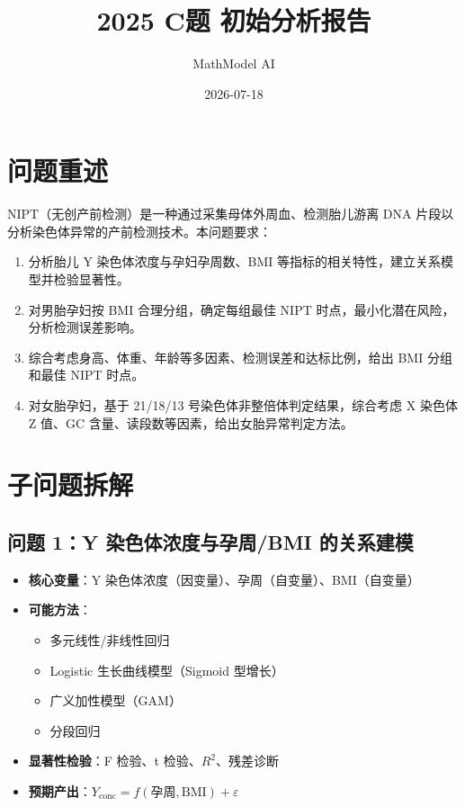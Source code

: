 \documentclass{internal-report}
\title{2025 C题 初始分析报告}
\author{MathModel AI}
\date{2026-07-18}
\begin{document}
\maketitle

\section{问题重述}

NIPT（无创产前检测）是一种通过采集母体外周血、检测胎儿游离 DNA 片段以分析染色体异常的产前检测技术。本问题要求：

\begin{enumerate}
  \item 分析胎儿 Y 染色体浓度与孕妇孕周数、BMI 等指标的相关特性，建立关系模型并检验显著性。
  \item 对男胎孕妇按 BMI 合理分组，确定每组最佳 NIPT 时点，最小化潜在风险，分析检测误差影响。
  \item 综合考虑身高、体重、年龄等多因素、检测误差和达标比例，给出 BMI 分组和最佳 NIPT 时点。
  \item 对女胎孕妇，基于 21/18/13 号染色体非整倍体判定结果，综合考虑 X 染色体 Z 值、GC 含量、读段数等因素，给出女胎异常判定方法。
\end{enumerate}

\section{子问题拆解}

\subsection{问题 1：Y 染色体浓度与孕周/BMI 的关系建模}

\begin{itemize}
  \item \textbf{核心变量}：Y 染色体浓度（因变量）、孕周（自变量）、BMI（自变量）
  \item \textbf{可能方法}：
    \begin{itemize}
      \item 多元线性/非线性回归
      \item Logistic 生长曲线模型（Sigmoid 型增长）
      \item 广义加性模型（GAM）
      \item 分段回归
    \end{itemize}
  \item \textbf{显著性检验}：F 检验、t 检验、$R^2$、残差诊断
  \item \textbf{预期产出}：$Y_{\text{conc}} = f(\text{孕周}, \text{BMI}) + \varepsilon$
\end{itemize}
\end{document}
